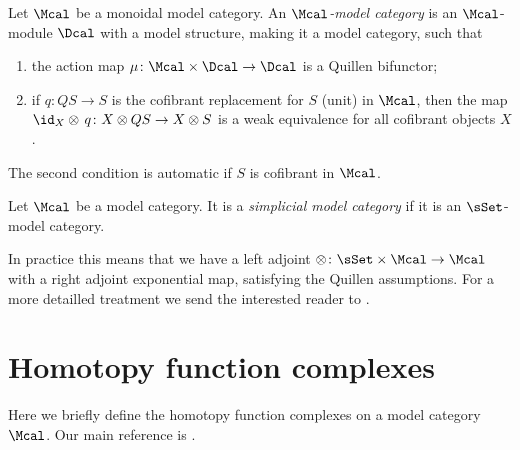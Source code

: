         \begin{defn}
            \label{defn:C_model_category}
            Let $\Mcal$ be a monoidal model category. An \emph{$\Mcal$-model category} is an $\Mcal$-module $\Dcal$ with a model structure, making it a model category, such that 
            \begin{enumerate}
                \item the action map $\mu\colon \Mcal \times \Dcal \to \Dcal$ is a Quillen bifunctor;
                \item if $q\colon QS \to S$ is the cofibrant replacement for $S$ (unit) in $\Mcal$, then the map $\id_X \otimes\, q\colon X \otimes QS \to X \otimes S$ is a weak equivalence for all cofibrant objects $X$. 
            \end{enumerate}
        \end{defn}
        The second condition is automatic if $S$ is cofibrant in $\Mcal$. 
        \begin{defn}
            \label{defn:simplicial_model_categories}
            Let $\Mcal$ be a model category. It is a \emph{simplicial model category} if it is an $\sSet$-model category.
        \end{defn}

        In practice this means that we have a left adjoint $\otimes\colon \sSet \times \Mcal \to \Mcal$ with a right adjoint exponential map, satisfying the Quillen assumptions.
        For a more detailled treatment we send the interested reader to \cite[4.2]{Hov:model}.



    \section{Homotopy function complexes}
        Here we briefly define the homotopy function complexes on a model category $\Mcal$. Our main reference is \cite[Chapter~15-17]{Hirs:loc}. 

